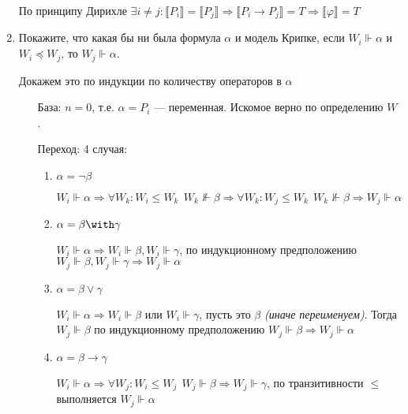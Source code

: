 \begin{enumerate}[wide, labelwidth=!, labelindent=0pt]
          По принципу Дирихле \(\exists i \neq j : \llbracket P_i \rrbracket = \llbracket P_j \rrbracket \Rightarrow \llbracket P_i \to P_j \rrbracket = T \Rightarrow \llbracket \varphi \rrbracket = T\)

    \item Покажите, что какая бы ни была формула $\alpha$ и модель Крипке,
          если $W_i \Vdash \alpha$ и $W_i \preceq W_j$, то $W_j \Vdash \alpha$.

          Докажем это по индукции по количеству операторов в \(\alpha\)

          \begin{itemize}
              \item [База:] \(n = 0\), т.е. \(\alpha = P_i\) --- переменная. Искомое верно по определению \(W\).
              \item [Переход:] 4 случая:
                    \begin{enumerate}
                        \item \(\alpha = \neg \beta\)

                              \(W_i \Vdash \alpha \Rightarrow \forall W_k: W_i \leq W_k \ \ W_k \nVdash \beta \Rightarrow \forall W_k: W_j \leq W_k \ \ W_k \nVdash \beta \Rightarrow W_j \Vdash \alpha\)

                        \item \(\alpha = \beta \with \gamma\)

                              \(W_i \Vdash \alpha \Rightarrow W_i \Vdash \beta, W_i \Vdash \gamma\), по индукционному предположению \(W_j \Vdash \beta, W_j \Vdash \gamma \Rightarrow W_j \Vdash \alpha\)

                        \item \(\alpha = \beta \lor \gamma\)

                              \(W_i \Vdash \alpha \Rightarrow W_i \Vdash \beta\) или \(W_i \Vdash \gamma\), пусть это \(\beta\) \textit{(иначе переименуем)}. Тогда \(W_j \Vdash \beta\) по индукционному предположению \(W_j \Vdash \beta \Rightarrow W_j \Vdash \alpha\)

                        \item \(\alpha = \beta \to \gamma\)

                              \(W_i \Vdash \alpha \Rightarrow \forall W_j : W_i \leq W_j \ \ W_j \Vdash \beta \Rightarrow W_j \Vdash \gamma\), по транзитивности \( \leq \) выполняется \(W_j \Vdash \alpha\)
                    \end{enumerate}
          \end{itemize}


\end{enumerate}
